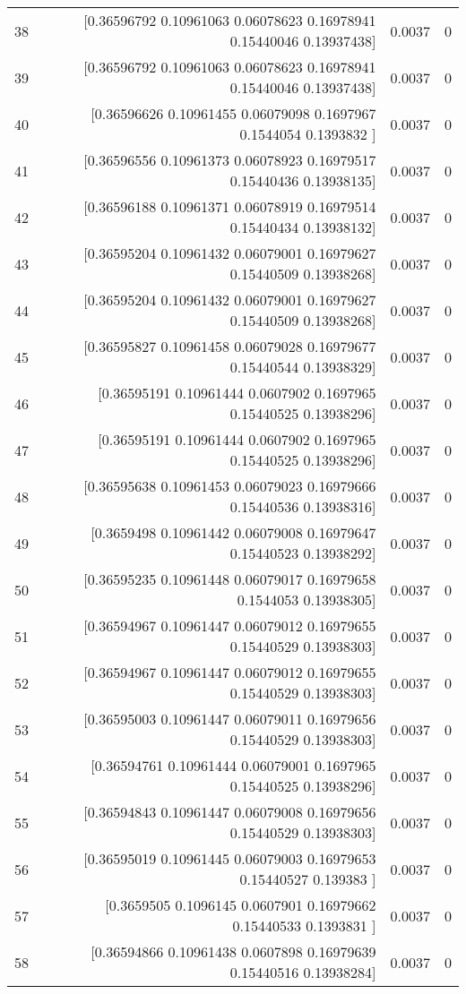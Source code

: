 \begin{longtable}{lrrr}
38 & [0.36596792 0.10961063 0.06078623 0.16978941 0.15440046 0.13937438] & 0.0037 & 0 \\
39 & [0.36596792 0.10961063 0.06078623 0.16978941 0.15440046 0.13937438] & 0.0037 & 0 \\
40 & [0.36596626 0.10961455 0.06079098 0.1697967  0.1544054  0.1393832 ] & 0.0037 & 0 \\
41 & [0.36596556 0.10961373 0.06078923 0.16979517 0.15440436 0.13938135] & 0.0037 & 0 \\
42 & [0.36596188 0.10961371 0.06078919 0.16979514 0.15440434 0.13938132] & 0.0037 & 0 \\
43 & [0.36595204 0.10961432 0.06079001 0.16979627 0.15440509 0.13938268] & 0.0037 & 0 \\
44 & [0.36595204 0.10961432 0.06079001 0.16979627 0.15440509 0.13938268] & 0.0037 & 0 \\
45 & [0.36595827 0.10961458 0.06079028 0.16979677 0.15440544 0.13938329] & 0.0037 & 0 \\
46 & [0.36595191 0.10961444 0.0607902  0.1697965  0.15440525 0.13938296] & 0.0037 & 0 \\
47 & [0.36595191 0.10961444 0.0607902  0.1697965  0.15440525 0.13938296] & 0.0037 & 0 \\
48 & [0.36595638 0.10961453 0.06079023 0.16979666 0.15440536 0.13938316] & 0.0037 & 0 \\
49 & [0.3659498  0.10961442 0.06079008 0.16979647 0.15440523 0.13938292] & 0.0037 & 0 \\
50 & [0.36595235 0.10961448 0.06079017 0.16979658 0.1544053  0.13938305] & 0.0037 & 0 \\
51 & [0.36594967 0.10961447 0.06079012 0.16979655 0.15440529 0.13938303] & 0.0037 & 0 \\
52 & [0.36594967 0.10961447 0.06079012 0.16979655 0.15440529 0.13938303] & 0.0037 & 0 \\
53 & [0.36595003 0.10961447 0.06079011 0.16979656 0.15440529 0.13938303] & 0.0037 & 0 \\
54 & [0.36594761 0.10961444 0.06079001 0.1697965  0.15440525 0.13938296] & 0.0037 & 0 \\
55 & [0.36594843 0.10961447 0.06079008 0.16979656 0.15440529 0.13938303] & 0.0037 & 0 \\
56 & [0.36595019 0.10961445 0.06079003 0.16979653 0.15440527 0.139383  ] & 0.0037 & 0 \\
57 & [0.3659505  0.1096145  0.0607901  0.16979662 0.15440533 0.1393831 ] & 0.0037 & 0 \\
58 & [0.36594866 0.10961438 0.0607898  0.16979639 0.15440516 0.13938284] & 0.0037 & 0 \\

\end{longtable}
